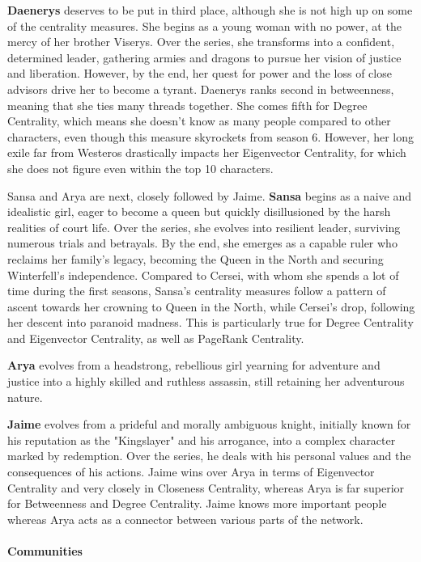 \documentclass[10pt,twocolumn,letterpaper]{article}
\begin{document}
\textbf{Daenerys} deserves to be put in third place, although she is not high up on some of the centrality measures. She begins as a young woman with no power, at the mercy of her brother Viserys. Over the series, she transforms into a confident, determined leader, gathering armies and dragons to pursue her vision of justice and liberation. However, by the end, her quest for power and the loss of close advisors drive her to become a tyrant. Daenerys ranks second in betweenness, meaning that she ties many threads together. She comes fifth for Degree Centrality, which means she doesn't know as many people compared to other characters, even though this measure skyrockets from season 6. However, her long exile far from Westeros drastically impacts her Eigenvector Centrality, for which she does not figure even within the top 10 characters.

Sansa and Arya are next, closely followed by Jaime. \textbf{Sansa} begins as a naive and idealistic girl, eager to become a queen but quickly disillusioned by the harsh realities of court life. Over the series, she evolves into resilient leader, surviving numerous trials and betrayals. By the end, she emerges as a capable ruler who reclaims her family’s legacy, becoming the Queen in the North and securing Winterfell's independence. Compared to Cersei, with whom she spends a lot of time during the first seasons, Sansa's centrality measures follow a pattern of ascent towards her crowning to Queen in the North, while Cersei's drop, following her descent into paranoid madness. This is particularly true for Degree Centrality and Eigenvector Centrality, as well as PageRank Centrality.

\textbf{Arya} evolves from a headstrong, rebellious girl yearning for adventure and justice into a highly skilled and ruthless assassin, still retaining her adventurous nature. 

\textbf{Jaime} evolves from a prideful and morally ambiguous knight, initially known for his reputation as the "Kingslayer" and his arrogance, into a complex character marked by redemption. Over the series, he deals with his personal values and the consequences of his actions. Jaime wins over Arya in terms of Eigenvector Centrality and very closely in Closeness Centrality, whereas Arya is far superior for Betweenness and Degree Centrality. Jaime knows more important people whereas Arya acts as a connector between various parts of the network.


\paragraph{Communities}
\end{document}
